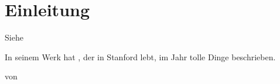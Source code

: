 \chapter{Einleitung}

Siehe  

\blindtext[3]



In seinem Werk  hat \citeauthor{knuth:1984}, der in Stanford lebt, im Jahr \citeyear{knuth:1984} tolle Dinge beschrieben.

 von \citeauthor{Ziegenhagen2022}

\cite{ziegenhagen:2017}


\cite{eckstein2022causality}

\blindtext[2]

\blindtext[2]


\blindtext[3]